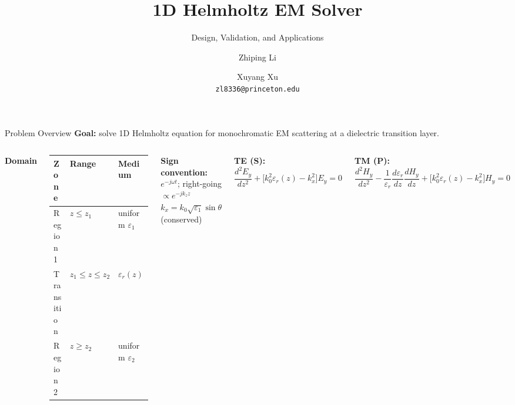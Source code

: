 \documentclass[aspectratio=169,10pt]{beamer}
\title{1D Helmholtz EM Solver}
\subtitle{Design, Validation, and Applications}
\author{Zhiping Li \and Xuyang Xu\\[4pt]
  \small\texttt{zl8336@princeton.edu}}
\institute{APC 523 Final Project}
\date{}
\begin{document}
\begin{frame}
  \titlepage
\end{frame}

\begin{frame}{Problem Overview}
  \textbf{Goal:} solve 1D Helmholtz equation for monochromatic EM scattering at a
  dielectric transition layer.

  \vspace{4pt}
  \begin{columns}[T]
      \textbf{Domain}\\[2pt]
      \begin{tabular}{lll}
        \toprule
        Zone & Range & Medium \\
        \midrule
        Region 1    & $z \le z_1$ & uniform $\varepsilon_1$ \\
        Transition  & $z_1 \le z \le z_2$ & $\varepsilon_r(z)$ \\
        Region 2    & $z \ge z_2$ & uniform $\varepsilon_2$ \\
        \bottomrule
      \end{tabular}

      \vspace{6pt}
      \textbf{Sign convention:} $e^{-j\omega t}$; right-going $\propto e^{-jk_z z}$\\
      $k_x = k_0\sqrt{\varepsilon_1}\sin\theta$ (conserved)

      \textbf{TE (S):}
      \[
        \frac{d^2 E_y}{dz^2} + \bigl[k_0^2\varepsilon_r(z) - k_x^2\bigr]E_y = 0
      \]

      \textbf{TM (P):}
      \[
        \frac{d^2 H_y}{dz^2}
        - \frac{1}{\varepsilon_r}\frac{d\varepsilon_r}{dz}\frac{dH_y}{dz}
        + \bigl[k_0^2\varepsilon_r(z) - k_x^2\bigr]H_y = 0
      \]
  \end{columns}
\end{frame}
\end{document}
